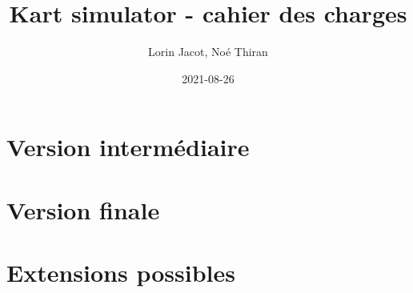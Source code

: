\documentclass{article}
\title{Kart simulator - cahier des charges}
\date{2021-08-26}
\author{Lorin Jacot, Noé Thiran}
\begin{document}
\maketitle
{}
\newpage
{}

\section{Version intermédiaire}

\section{Version finale}

\section{Extensions possibles}
\end{document}
